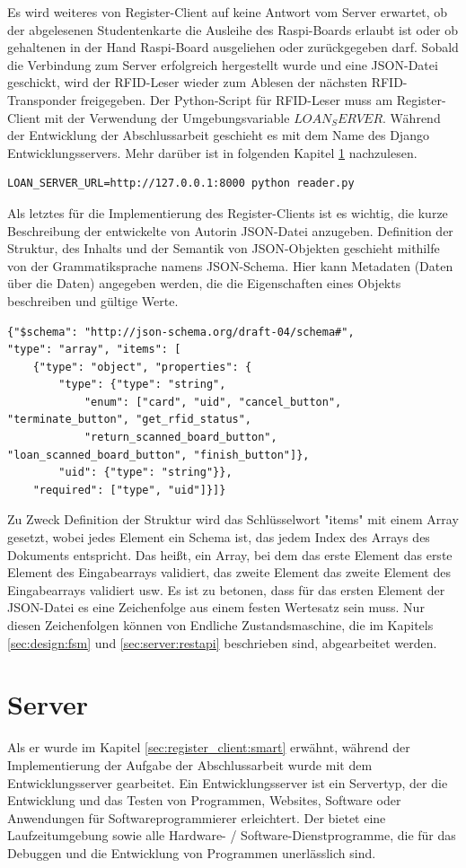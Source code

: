 Es wird weiteres von Register-Client auf keine Antwort vom Server erwartet, ob der abgelesenen Studentenkarte die Ausleihe des Raspi-Boards erlaubt ist oder ob gehaltenen in der Hand Raspi-Board ausgeliehen oder zurückgegeben darf. Sobald die Verbindung zum Server erfolgreich hergestellt wurde und eine JSON-Datei geschickt, wird der RFID-Leser wieder zum Ablesen der nächsten RFID-Transponder freigegeben. Der Python-Script für RFID-Leser muss am Register-Client mit der Verwendung der Umgebungsvariable $LOAN_SERVER$. Während der Entwicklung der Abschlussarbeit geschieht es mit dem Name des Django Entwicklungsservers. Mehr darüber ist in folgenden Kapitel \ref{sec:server} nachzulesen.
\begin{lstlisting}
LOAN_SERVER_URL=http://127.0.0.1:8000 python reader.py
\end{lstlisting}
Als letztes für die Implementierung des Register-Clients ist es wichtig, die kurze Beschreibung der entwickelte von Autorin JSON-Datei anzugeben. Definition der Struktur, des Inhalts und der Semantik von JSON-Objekten geschieht mithilfe von der Grammatiksprache namens JSON-Schema. Hier kann Metadaten (Daten über die Daten) angegeben werden, die die Eigenschaften eines Objekts beschreiben und gültige Werte. 

\begin{lstlisting}
{"$schema": "http://json-schema.org/draft-04/schema#",
"type": "array", "items": [
	{"type": "object", "properties": {
		"type": {"type": "string",
			"enum": ["card", "uid", "cancel_button", "terminate_button", "get_rfid_status",
			"return_scanned_board_button", "loan_scanned_board_button", "finish_button"]},
		"uid": {"type": "string"}},
	"required": ["type", "uid"]}]}
\end{lstlisting}

Zu Zweck Definition der Struktur wird das Schlüsselwort "items" mit einem Array gesetzt, wobei jedes Element ein Schema ist, das jedem Index des Arrays des Dokuments entspricht. Das heißt, ein Array, bei dem das erste Element das erste Element des Eingabearrays validiert, das zweite Element das zweite Element des Eingabearrays validiert usw\cite{website:14}. Es ist zu betonen, dass für das ersten Element der JSON-Datei es eine Zeichenfolge aus einem festen Wertesatz sein muss. Nur diesen Zeichenfolgen können von Endliche Zustandsmaschine, die im Kapitels \ref{sec:design:fsm} und \ref{sec:server:restapi} beschrieben sind, abgearbeitet werden. 

\section{Server}
\label{sec:server}
Als er wurde im Kapitel \ref{sec:register_client:smart} erwähnt, während der Implementierung der Aufgabe der Abschlussarbeit wurde mit dem Entwicklungsserver gearbeitet. Ein Entwicklungsserver ist ein Servertyp, der die Entwicklung und das Testen von Programmen, Websites, Software oder Anwendungen für Softwareprogrammierer erleichtert. Der bietet eine Laufzeitumgebung sowie alle Hardware- / Software-Dienstprogramme, die für das Debuggen und die Entwicklung von Programmen unerlässlich sind.



